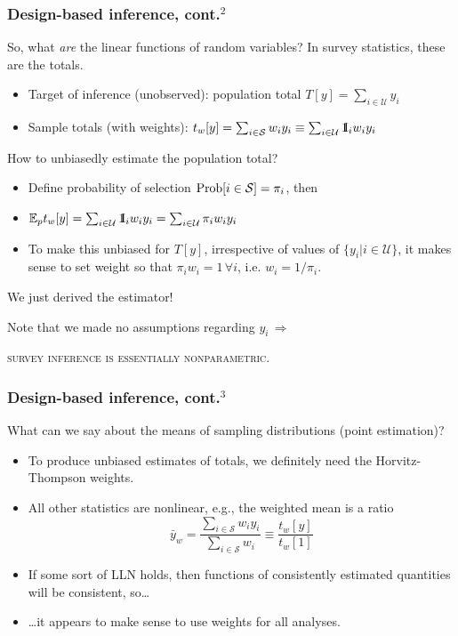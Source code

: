 \documentclass{beamer}
\newcommand{\Expect}{\mathbb{E}}
\newcommand{\One}{{\rm 1\kern-0.3em I}}
\begin{document}
\begin{frame}\frametitle{Design-based inference, cont.$^2$}

So, what \textit{are} the linear functions of random variables? In survey statistics, these are the totals.

\begin{itemize}
    \item Target of inference (unobserved): population total $T[y] = \sum_{i\in\mathcal{U}} y_i$
    \item Sample totals (with weights): $t_w[y] = \sum_{i\in\mathcal{S}} w_i y_i \equiv \sum_{i\in\mathcal{U}} \One_i w_i y_i$
\end{itemize}

How to unbiasedly estimate the population total?
\begin{itemize}
    \item Define probability of selection ${\rm Prob}[i\in\mathcal{S}]=\pi_i$, then
    \item $\Expect_p t_w[y] = \sum_{i\in\mathcal{U}} \One_i w_i y_i = \sum_{i\in\mathcal{U}} \pi_i w_i y_i$
    \item To make this unbiased for $T[y]$, irrespective of values of $\{ y_i| i\in \mathcal{U}\}$,
        it makes sense to set weight so that $\pi_i w_i = 1 \, \forall i$, i.e. $w_i = 1/\pi_i$.
\end{itemize}

We just derived the \citet{horvitz:thompson:1952} estimator!

\bigskip

Note that we made no assumptions regarding $y_i \, \Rightarrow$

\centering

\textsc{survey inference is essentially nonparametric}.

\end{frame}

\begin{frame}\frametitle{Design-based inference, cont.$^3$}

What can we say about the means of sampling distributions (point estimation)?

\begin{itemize}
    \item To produce unbiased estimates of totals, we definitely need the Horvitz-Thompson weights.
    \item All other statistics are nonlinear, e.g., the weighted mean is a ratio
        $$ \bar y_w = \frac{\sum_{i\in\mathcal{S}} w_i y_i}{\sum_{i\in\mathcal{S}} w_i} \equiv \frac{t_w[y]}{t_w[1]} $$
    \item If some sort of LLN holds, then functions of consistently estimated quantities
        will be consistent, so\ldots
    \item \ldots it appears to make sense to use weights for all analyses.
\end{itemize}

\end{frame}
\end{document}
